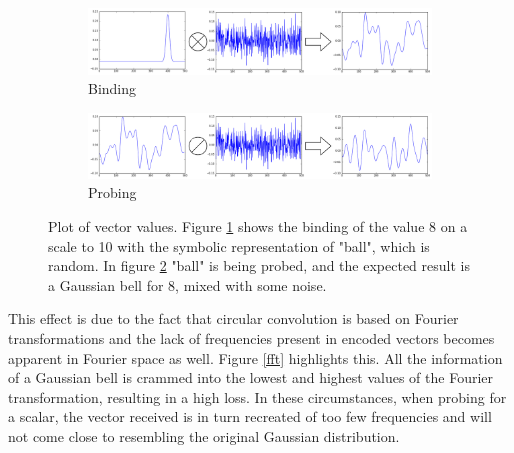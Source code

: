 \documentclass[conference]{IEEEtran}
\begin{document}
	
	\begin{figure}
		\begin{subfigure}{1\columnwidth}
			\includegraphics[width=\columnwidth]{img/scalar-pre-perm.png}
			\caption{Binding}
			\label{no-perm-a}
		\end{subfigure}
		\begin{subfigure}{1\columnwidth}
			\includegraphics[width=\columnwidth]{img/scalar-pre-perm-probe.png}
			\caption{Probing}
			\label{no-perm-b}
		\end{subfigure}
		\caption{Plot of vector values.
Figure \ref{no-perm-a} shows the binding of the value 8 on a scale to 10 with the symbolic representation of "ball", which is random.
In figure \ref{no-perm-b} "ball" is being probed, and the expected result is a Gaussian bell for 8, mixed with some noise.}
		\label{no-perm}
	\end{figure}
	
	This effect is due to the fact that circular convolution is based on Fourier transformations and the lack of frequencies present in encoded vectors becomes apparent in Fourier space as well.
Figure \ref{fft} highlights this.
All the information of a Gaussian bell is crammed into the lowest and highest values of the Fourier transformation, resulting in a high loss.
In these circumstances, when probing for a scalar, the vector received is in turn recreated of too few frequencies and will not come close to resembling the original Gaussian distribution.
\end{document}

